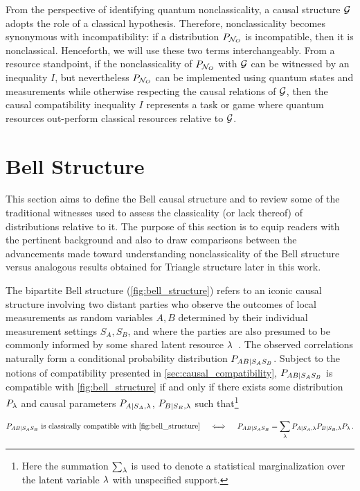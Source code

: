 \documentclass[aps, 10pt, english, twoside, pra, nofootinbib, tightenlines, longbibliography, superscriptaddress]{revtex4-1}
\begin{document}
    From the perspective of identifying quantum nonclassicality, a causal structure $\mathcal{G}$ adopts the role of a classical hypothesis. Therefore, nonclassicality becomes synonymous with incompatibility: if a distribution $\prob[\nodes_{O}]$ is incompatible, then it is nonclassical. Henceforth, we will use these two terms interchangeably. From a resource standpoint, if the nonclassicality of $\prob[\nodes_{O}]$ with $\mathcal{G}$ can be witnessed by an inequality $I$, but nevertheless $\prob[\nodes_{O}]$ can be implemented using quantum states and measurements while otherwise respecting the causal relations of $\mathcal{G}$, then the causal compatibility inequality $I$ represents a task or game where quantum resources out-perform classical resources relative to $\mathcal{G}$.

    \section{Bell Structure}
    \label{sec:bell_structure}
    This section aims to define the Bell causal structure and to review some of the traditional witnesses used to assess the classicality (or lack thereof) of distributions relative to it. The purpose of this section is to equip readers with the pertinent background and also to draw comparisons between the advancements made toward understanding nonclassicality of the Bell structure versus analogous results obtained for Triangle structure later in this work.

    The bipartite Bell structure (\cref{fig:bell_structure}) refers to an iconic causal structure involving two distant parties who observe the outcomes of local measurements as random variables $A,B$ determined by their individual measurement settings $S_A,S_B$, and where the parties are also presumed to be commonly informed by some shared latent resource $\lambda$~\cite{Brunner_2013}. The observed correlations naturally form a conditional probability distribution $\prob[AB|S_AS_B]$. Subject to the notions of compatibility presented in \cref{sec:causal_compatibility}, $\prob[AB|S_AS_B]$ is compatible with \cref{fig:bell_structure} if and only if there exists some distribution $\prob[\la]$ and causal parameters $\prob[A|S_A,\la]$, $\prob[B|S_B,\la]$ such that\footnote{Here the summation $\sum_{\lambda}$ is used to denote a statistical marginalization over the latent variable $\lambda$ with unspecified support.}

    \begin{align}\label{eq:bellcompat}
     \prob[AB|S_AS_B] \text{ is classically compatible with \cref{fig:bell_structure}} \quad\iff \quad \prob[AB|S_AS_B] = \sum_{\la} \prob[A|S_A,\la]\prob[B|S_B,\la]\prob[\la]\,.
    \end{align}
\end{document}
